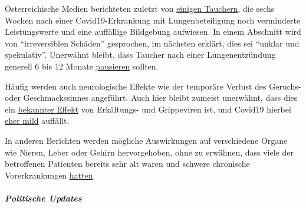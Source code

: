 Österreichische Medien berichteten zuletzt von
\href{https://www.rainews.it/tgr/tagesschau/articoli/2020/04/tag-Coronavirus-Lungeschaden-Forschung-Uniklinik-Innsbruck-6708e11e-28dc-4843-a760-e7f926ace61c.html}{einigen
Tauchern}, die sechs Wochen nach einer Covid19-Erkrankung mit
Lungenbeteiligung noch verminderte Leistungswerte und eine auffällige
Bildgebung aufwiesen. In einem Abschnitt wird von ``irreversiblen
Schäden'' gesprochen, im nächsten erklärt, dies sei ``unklar und
spekulativ''. Unerwähnt bleibt, dass Taucher nach einer Lungenentzündung
generell 6 bis 12 Monate
\href{https://www.gesundheitsfrage.net/g/frage/tauchen-lungenentzuendung}{pausieren}
sollten.

Häufig werden auch neurologische Effekte wie der temporäre Verlust des
Geruchs- oder Geschmackssinnes angeführt. Auch hier bleibt zumeist
unerwähnt, dass dies ein
\href{https://www.ncbi.nlm.nih.gov/pubmed/25294743}{bekannter Effekt}
von Erkältungs- und Grippeviren ist, und Covid19 hierbei
\href{https://www.ncbi.nlm.nih.gov/pubmed/23948436}{eher mild} auffällt.

In anderen Berichten werden mögliche Auswirkungen auf verschiedene
Organe wie Nieren, Leber oder Gehirn hervorgehoben, ohne zu erwähnen,
dass viele der betroffenen Patienten bereits sehr alt waren und schwere
chronische Vorerkrankungen
\href{https://www.epicentro.iss.it/coronavirus/sars-cov-2-decessi-italia}{hatten}.

\hypertarget{politische-updates}{%
\subparagraph{\texorpdfstring{\textbf{Politische
Updates}}{Politische Updates}}\label{politische-updates}}

